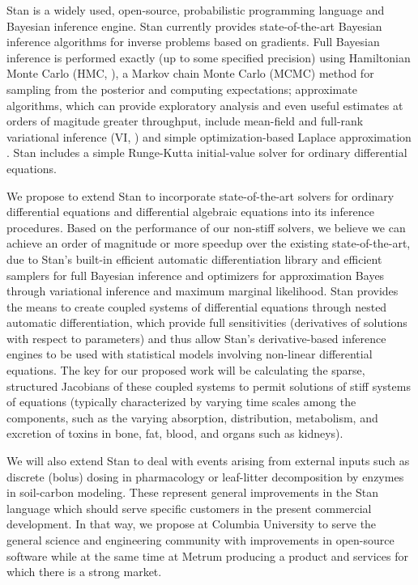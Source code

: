 \documentclass[11pt]{nih2016}
\begin{document}
Stan \cite{carpenter-et-al:2016, stan-development-team:2016,
  mcelreath:2016} is a widely used, open-source, probabilistic
programming language and Bayesian inference engine.  Stan currently
provides state-of-the-art Bayesian inference algorithms for inverse
problems based on gradients.  Full Bayesian inference is performed
exactly (up to some specified precision) using Hamiltonian Monte Carlo
(HMC, \cite{neal:2011}), a Markov chain Monte Carlo (MCMC) method for
sampling from the posterior and computing expectations; approximate
algorithms, which can provide exploratory analysis and even useful
estimates at orders of magitude greater throughput, include mean-field
and full-rank variational inference (VI,
\cite{wainwright-jordan:2008}) and simple optimization-based Laplace
approximation \cite{gelman-et-al:2013}.  Stan includes a simple
Runge-Kutta initial-value solver for ordinary differential equations.

We propose to extend Stan to incorporate state-of-the-art solvers for
ordinary differential equations and differential algebraic equations
into its inference procedures.  Based on the performance of our
non-stiff solvers, we believe we can achieve an order of magnitude or
more speedup over the existing state-of-the-art, due to Stan's
built-in efficient automatic differentiation library and efficient
samplers for full Bayesian inference and optimizers for approximation
Bayes through variational inference and maximum marginal likelihood.
Stan provides the means to create coupled systems of differential
equations through nested automatic differentiation, which provide full
sensitivities (derivatives of solutions with respect to parameters)
\cite{lee-hovland:2002,serban-hindmarsh:2003,carpenter-et-al:2015} and
thus allow Stan's derivative-based inference engines to be used with
statistical models involving non-linear differential equations.  The
key for our proposed work will be calculating the sparse, structured
Jacobians of these coupled systems to permit solutions of stiff
systems of equations (typically characterized by varying time scales
among the components, such as the varying absorption, distribution,
metabolism, and excretion of toxins in bone, fat, blood, and organs
such as kidneys).

We will also extend Stan to deal with events arising from external
inputs such as discrete (bolus) dosing in pharmacology or leaf-litter
decomposition by enzymes in soil-carbon modeling. These represent
general improvements in the Stan language which should serve specific
customers in the present commercial development.  In that way, we
propose at Columbia University to serve the general science and
engineering community with improvements in open-source software while
at the same time at Metrum producing a product and services for which
there is a strong market.
\end{document}
